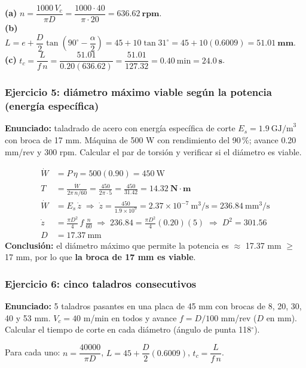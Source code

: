 \documentclass[12pt,a4paper]{article}
\begin{document}
\textbf{(a)} $n = \dfrac{1000\,V_c}{\pi D} = \dfrac{1000\cdot 40}{\pi\cdot 20} =
	\mathbf{636.62\ rpm}$.\\
\textbf{(b)} $L = e + \dfrac{D}{2}\tan\!\left(90^\circ -
	\dfrac{\alpha}{2}\right) = 45 + 10\tan 31^\circ = 45 + 10(0.6009) =
	\mathbf{51.01\ mm}$.\\
\textbf{(c)} $t_c = \dfrac{L}{f\,n} = \dfrac{51.01}{0.20(636.62)} =
	\dfrac{51.01}{127.32} = 0.40\ \text{min} = \mathbf{24.0\ s}$.

\subsubsection*{Ejercicio 5: diámetro máximo viable según la potencia (energía
	específica)}
\textbf{Enunciado:} taladrado de acero con energía específica de corte $E_s =
	1.9\ \text{GJ/m}^3$ con broca de 17 mm. Máquina de 500 W con rendimiento del
90\,\%; avance 0.20 mm/rev y 300 rpm. Calcular el par de torsión y verificar si
el diámetro es viable.

\begin{align*}
	\dot W & = P\,\eta = 500(0.90) = 450\ \text{W}                                                                                  \\
	T      & = \frac{\dot W}{2\pi\,n/60} = \frac{450}{2\pi\cdot 5} =
	\frac{450}{31.42} =
	\mathbf{14.32\ N\cdot m}
	\\
	\dot W & = E_s\,\dot z \;\Rightarrow\; \dot z = \frac{450}{1.9\times10^{9}} =
	2.37\times10^{-7}\ \text{m}^3/\text{s} = 236.84\ \text{mm}^3/\text{s}
	\\
	\dot z & = \frac{\pi D^2}{4}\, f\,\frac{n}{60} \;\Rightarrow\; 236.84 = \frac{\pi D^2}{4}(0.20)(5) \;\Rightarrow\; D^2 = 301.56 \\
	D      & = 17.37\ \text{mm}
\end{align*}
\textbf{Conclusión:} el diámetro máximo que permite la potencia es $\approx$
17.37 mm $\geq$ 17 mm, por lo que \textbf{la broca de 17 mm es viable}.

\subsubsection*{Ejercicio 6: cinco taladros consecutivos}
\textbf{Enunciado:} 5 taladros pasantes en una placa de 45 mm con brocas de 8,
20, 30, 40 y 53 mm. $V_c = 40$ m/min en todos y avance $f = D/100$ mm/rev ($D$
en mm). Calcular el tiempo de corte en cada diámetro (ángulo de punta
118$^\circ$).

Para cada uno: $n = \dfrac{40000}{\pi D}$, $L = 45 + \dfrac{D}{2}(0.6009)$, $t_c
	= \dfrac{L}{f\,n}$.
\end{document}
